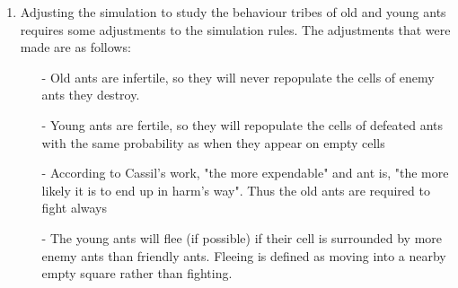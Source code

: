\begin{enumerate}
\item Adjusting the simulation to study the behaviour tribes of old and young 
ants requires some adjustments to the simulation rules.  The adjustments that 
were made are as follows:

\begin{itemize}
\item[-]Old ants are infertile, so they will never repopulate the cells of 
enemy ants they destroy.
\item[-]Young ants are fertile, so they will repopulate the cells of defeated 
ants with the same probability as when they appear on empty cells
\item[-]According to Cassil's work, "the more expendable" and ant is, "the more 
likely it is to end up in harm's way".  Thus the old ants are required to fight 
always
\item[-]The young ants will flee (if possible) if their cell is surrounded by
more enemy ants than friendly ants.  Fleeing is defined as moving into a nearby 
empty square rather than fighting.
\end{itemize}

\end{enumerate}
